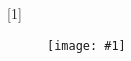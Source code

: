 

\newrobustcmd{\pdfsnippet}[1]{%
\begin{figure}[htb!]%
    \texttt{[image: \#1]}%
\end{figure}%
}%
